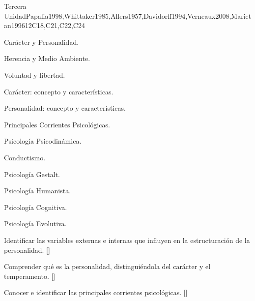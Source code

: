 \begin{syllabus}
\begin{unit}{}{Tercera Unidad}{Papalia1998,Whittaker1985,Allers1957,Davidorff1994,Verneaux2008,Marietan1996}{12}{C18,C21,C22,C24}
\begin{topics}
  \item Carácter y Personalidad.
    \begin{subtopics}
	\item Herencia y Medio Ambiente.
	\item Voluntad y libertad.
	\item Carácter: concepto y características.
	\item Personalidad: concepto y características.
    \end{subtopics}
  \item Principales Corrientes Psicológicas.
    \begin{subtopics}
	\item Psicología Psicodinámica.
	\item Conductismo.
	\item Psicología Gestalt.
	\item Psicología Humanista.
	\item Psicología Cognitiva.
	\item Psicología Evolutiva.
    \end{subtopics}
\end{topics}
\begin{learningoutcomes}
	\item Identificar las variables externas e internas que influyen en la estructuración de la personalidad. [\Familiarity]
	\item Comprender qué es la personalidad, distinguiéndola del carácter y el temperamento. [\Familiarity]
	\item Conocer e identificar las principales corrientes psicológicas. [\Familiarity]
\end{learningoutcomes}
\end{unit}



\begin{coursebibliography}
\end{coursebibliography}

\end{syllabus}
